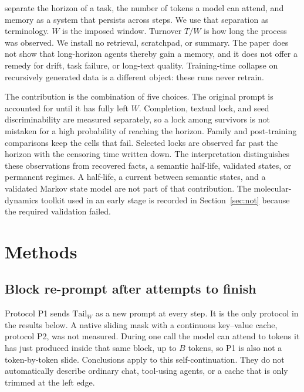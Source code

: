 \documentclass[10pt]{article}
\begin{document}
\citet{chen2026horizon} separate the horizon of a task, the number of
tokens a model can attend, and memory as a system that persists across
steps.
We use that separation as terminology.
$W$ is the imposed window.
Turnover $T/W$ is how long the process was observed.
We install no retrieval, scratchpad, or summary.
The paper does not show that long-horizon agents thereby gain a memory,
and it does not offer a remedy for drift, task failure, or long-text
quality.
Training-time collapse on recursively generated data
\citep{shumailov2024} is a different object: these runs never retrain.

The contribution is the combination of five choices.
The original prompt is accounted for until it has fully left $W$.
Completion, textual lock, and seed discriminability are measured
separately, so a lock among survivors is not mistaken for a high
probability of reaching the horizon.
Family and post-training comparisons keep the cells that fail.
Selected locks are observed far past the horizon with the censoring time
written down.
The interpretation distinguishes these observations from recovered
facts, a semantic half-life, validated states, or permanent regimes.
A half-life, a current between semantic states, and a validated
Markov state model are not part of that contribution.
The molecular-dynamics toolkit used in an early stage
\citep{wu2020vampnets,paul2019core} is recorded in
Section~\ref{sec:not} because the required validation failed.

\section{Methods}
\label{sec:methods}

\subsection{Block re-prompt after attempts to finish}
\label{sec:process}

Protocol P1 sends $\mathrm{Tail}_W$ as a new prompt at every step.
It is the only protocol in the results below.
A native sliding mask with a continuous key--value cache, protocol P2,
was not measured.
During one call the model can attend to tokens it has just produced
inside that same block, up to $B$ tokens, so P1 is also not a
token-by-token slide.
Conclusions apply to this self-continuation.
They do not automatically describe ordinary chat, tool-using agents, or
a cache that is only trimmed at the left edge.
\end{document}
